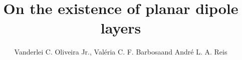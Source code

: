 \documentclass[manuscript,blind]{geophysics}
\begin{document}
\title{On the existence of planar dipole layers}

\renewcommand{\thefootnote}{\fnsymbol{footnote}} 


\address{
\footnotemark[2] Observat\'orio Nacional, Rio de Janeiro, Brazil\\
\footnotemark[3] Universidade do Estado do Rio de Janeiro, Rio de Janeiro, Brazil\\
\footnotemark[1] Corresponding author: vanderlei@on.br}
\author{Vanderlei C. Oliveira Jr.\footnotemark[2] \footnotemark[1], Val\'eria C. F. Barbosa\footnotemark[2] and Andr\'e L. A. Reis \footnotemark[3]}


\maketitle

%
%

%
%
%
%

%
%
%

\newpage



\clearpage

%
\end{document}

